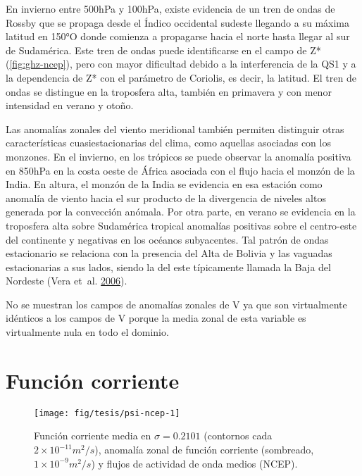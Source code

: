 \documentclass[spanish,a4paper,12p]{book}
\begin{document}
En invierno entre 500hPa y 100hPa, existe evidencia de un tren de ondas
de Rossby que se propaga desde el Índico occidental sudeste llegando a
su máxima latitud en 150°O donde comienza a propagarse hacia el norte
hasta llegar al sur de Sudamérica. Este tren de ondas puede
identificarse en el campo de Z* (\autoref{fig:ghz-ncep}), pero con mayor
dificultad debido a la interferencia de la QS1 y a la dependencia de Z*
con el parámetro de Coriolis, es decir, la latitud. El tren de ondas se
distingue en la troposfera alta, también en primavera y con menor
intensidad en verano y otoño.

Las anomalías zonales del viento meridional también permiten distinguir
otras características cuasiestacionarias del clima, como aquellas
asociadas con los monzones. En el invierno, en los trópicos se puede
observar la anomalía positiva en 850hPa en la costa oeste de África
asociada con el flujo hacia el monzón de la India. En altura, el monzón
de la India se evidencia en esa estación como anomalía de viento hacia
el sur producto de la divergencia de niveles altos generada por la
convección anómala. Por otra parte, en verano se evidencia en la
troposfera alta sobre Sudamérica tropical anomalías positivas sobre el
centro-este del continente y negativas en los océanos subyacentes. Tal
patrón de ondas estacionario se relaciona con la presencia del Alta de
Bolivia y las vaguadas estacionarias a sus lados, siendo la del este
típicamente llamada la Baja del Nordeste (Vera et~al.
\protect\hyperlink{ref-Vera2006}{2006}).

No se muestran los campos de anomalías zonales de V ya que son
virtualmente idénticos a los campos de V porque la media zonal de esta
variable es virtualmente nula en todo el dominio.

\begin{landscape}\end{landscape}

\section{Función corriente}\label{funcion-corriente}

\begin{landscape}\begin{figure}

{\centering \texttt{[image: fig/tesis/psi-ncep-1]} 

}

\caption{Función corriente media en $\sigma = 0.2101$ (contornos cada $2\times10^{-11}m^2/s$), anomalía zonal de función corriente (sombreado,  $1\times10^{-9}m^2/s$) y flujos de actividad de onda medios (NCEP).}\label{fig:psi-ncep}
\end{figure}
\end{landscape}
\end{document}
